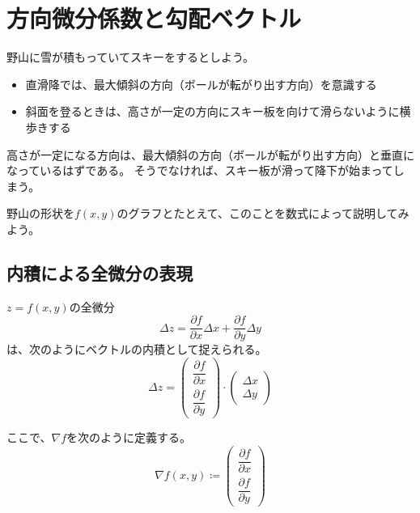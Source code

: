 \documentclass[../../../topic_calculus]{subfiles}
\begin{document}
\sectionline
\section{方向微分係数と勾配ベクトル}

野山に雪が積もっていてスキーをするとしよう。

\begin{itemize}
  \item 直滑降では、最大傾斜の方向（ボールが転がり出す方向）を意識する
  \item 斜面を登るときは、高さが一定の方向にスキー板を向けて滑らないように横歩きする
\end{itemize}

高さが一定になる方向は、最大傾斜の方向（ボールが転がり出す方向）と垂直になっているはずである。
そうでなければ、スキー板が滑って降下が始まってしまう。

\br

野山の形状を$f(x,y)$のグラフとたとえて、このことを数式によって説明してみよう。

\subsection{内積による全微分の表現}

$z=f(x,y)$の全微分
\begin{equation*}
  \Delta z = \frac{\partial f}{\partial x}\Delta x + \frac{\partial f}{\partial y}\Delta y
\end{equation*}
は、次のようにベクトルの内積として捉えられる。
\begin{equation*}
  \Delta z = \begin{pmatrix} \dfrac{\partial f}{\partial x} \\ \dfrac{\partial f}{\partial y} \end{pmatrix} \cdot \begin{pmatrix} \Delta x \\ \Delta y \end{pmatrix}
\end{equation*}

ここで、$\nabla f$を次のように定義する。
\begin{equation*}
  \nabla f(x,y) \coloneqq \begin{pmatrix} \dfrac{\partial f}{\partial x} \\ \dfrac{\partial f}{\partial y} \end{pmatrix}
\end{equation*}
\end{document}
